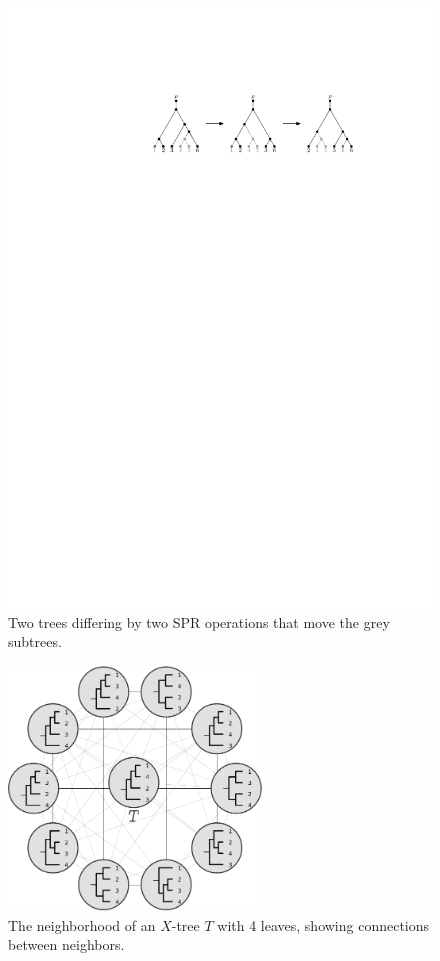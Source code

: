 \documentclass[11pt,onecolumn,conference]{IEEEtran}
\let\MYoriglatexcaption\caption
\renewcommand{\caption}[2][\relax]{\MYoriglatexcaption[#2]{#2}}
\begin{document}
\begin{figure}
	\includegraphics[scale=1.25]{figs/two-spr}
	\caption{Two trees differing by two SPR operations that move the grey subtrees.}
	\label{fig:two-spr}
\end{figure}
\begin{figure}
	\includegraphics[width=0.6\textwidth]{figs/neighborhood}
	\caption{The neighborhood of an $X$-tree $T$ with 4 leaves, showing connections between neighbors.}
	\label{fig:neighborhood}
\end{figure}
\end{document}
